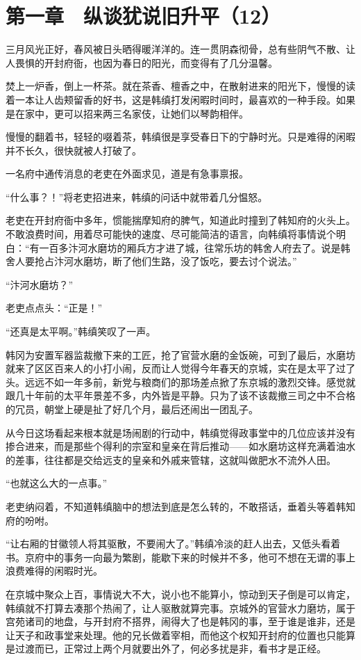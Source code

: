 \section{第一章　纵谈犹说旧升平（12）}

三月风光正好，春风被日头晒得暖洋洋的。连一贯阴森彻骨，总有些阴气不散、让人畏惧的开封府衙，也因为春日的阳光，而变得有了几分温馨。

焚上一炉香，倒上一杯茶。就在茶香、檀香之中，在散射进来的阳光下，慢慢的读着一本让人齿颊留香的好书，这是韩缜打发闲暇时间时，最喜欢的一种手段。如果是在家中，更可以招来两三名家伎，让她们以琴韵相伴。

慢慢的翻着书，轻轻的啜着茶，韩缜很是享受春日下的宁静时光。只是难得的闲暇并不长久，很快就被人打破了。

一名府中通传消息的老吏在外面求见，道是有急事禀报。

“什么事？！”将老吏招进来，韩缜的问话中就带着几分愠怒。

老吏在开封府衙中多年，惯能揣摩知府的脾气，知道此时撞到了韩知府的火头上。不敢浪费时间，用着尽可能快的速度、尽可能简洁的语言，向韩缜将事情说个明白：“有一百多汴河水磨坊的厢兵方才进了城，往常乐坊的韩舍人府去了。说是韩舍人要抢占汴河水磨坊，断了他们生路，没了饭吃，要去讨个说法。”

“汴河水磨坊？”

老吏点点头：“正是！”

“还真是太平啊。”韩缜笑叹了一声。

韩冈为安置军器监裁撤下来的工匠，抢了官营水磨的金饭碗，可到了最后，水磨坊就来了区区百来人的小打小闹，反而让人觉得今年春天的京城，实在是太平了过了头。远远不如一年多前，新党与粮商们的那场差点掀了东京城的激烈交锋。感觉就跟几十年前的太平年景差不多，内外皆是平静。只为了该不该裁撤三司之中不合格的冗员，朝堂上硬是扯了好几个月，最后还闹出一团乱子。

从今日这场看起来根本就是场闹剧的行动中，韩缜觉得政事堂中的几位应该并没有掺合进来，而是那些个得利的宗室和皇亲在背后推动——如水磨坊这样充满着油水的差事，往往都是交给远支的皇亲和外戚来管辖，这就叫做肥水不流外人田。

“也就这么大的一点事。”

老吏纳闷着，不知道韩缜脑中的想法到底是怎么转的，不敢搭话，垂着头等着韩知府的吩咐。

“让右厢的甘徽领人将其驱散，不要闹大了。”韩缜冷淡的赶人出去，又低头看着书。京府中的事务一向最为繁剧，能歇下来的时候并不多，他可不想在无谓的事上浪费难得的闲暇时光。

在京城中聚众上百，事情说大不大，说小也不能算小，惊动到天子倒是可以肯定，韩缜就不打算去凑那个热闹了，让人驱散就算完事。京城外的官营水力磨坊，属于宫苑诸司的地盘，与开封府不搭界，闹得大了也是韩冈的事，至于谁是谁非，还是让天子和政事堂来处理。他的兄长做着宰相，而他这个权知开封府的位置也只能算是过渡而已，正常过上两个月就要出外了，何必多扰是非，看书才是正经。

